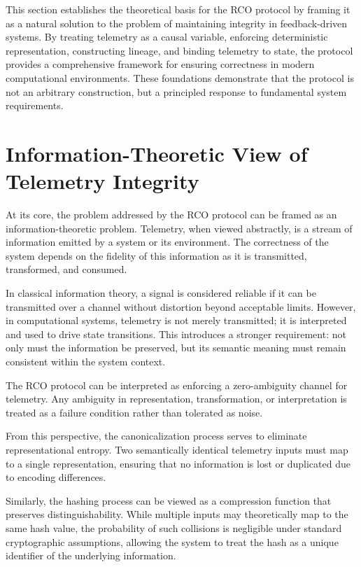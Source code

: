 This section establishes the theoretical basis for the RCO protocol by framing it as a natural solution to the problem of maintaining integrity in feedback-driven systems. By treating telemetry as a causal variable, enforcing deterministic representation, constructing lineage, and binding telemetry to state, the protocol provides a comprehensive framework for ensuring correctness in modern computational environments. These foundations demonstrate that the protocol is not an arbitrary construction, but a principled response to fundamental system requirements.

\section{Information-Theoretic View of Telemetry Integrity}

At its core, the problem addressed by the RCO protocol can be framed as an information-theoretic problem. Telemetry, when viewed abstractly, is a stream of information emitted by a system or its environment. The correctness of the system depends on the fidelity of this information as it is transmitted, transformed, and consumed.

In classical information theory, a signal is considered reliable if it can be transmitted over a channel without distortion beyond acceptable limits. However, in computational systems, telemetry is not merely transmitted; it is interpreted and used to drive state transitions. This introduces a stronger requirement: not only must the information be preserved, but its semantic meaning must remain consistent within the system context.

The RCO protocol can be interpreted as enforcing a zero-ambiguity channel for telemetry. Any ambiguity in representation, transformation, or interpretation is treated as a failure condition rather than tolerated as noise.

From this perspective, the canonicalization process serves to eliminate representational entropy. Two semantically identical telemetry inputs must map to a single representation, ensuring that no information is lost or duplicated due to encoding differences.

Similarly, the hashing process can be viewed as a compression function that preserves distinguishability. While multiple inputs may theoretically map to the same hash value, the probability of such collisions is negligible under standard cryptographic assumptions, allowing the system to treat the hash as a unique identifier of the underlying information.

